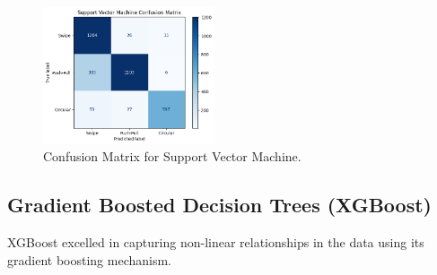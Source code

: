 \documentclass[10pt,twocolumn,letterpaper]{article}
\begin{document}
\begin{table}[h]
\small
\begin{center}
\caption{Performance Metrics for Support Vector Machine}
\vspace{0.1cm}
\end{center}
\end{table}

\begin{figure}[h]
  \centering
  \includegraphics[width=0.45\textwidth]{figures/confusion_matrix_svm.png}
  \caption{Confusion Matrix for Support Vector Machine.}
  \label{fig:confusion_matrix_svm}
\end{figure}

\subsection{Gradient Boosted Decision Trees (XGBoost)}

XGBoost excelled in capturing non-linear relationships in the data using its gradient boosting mechanism.
\end{document}
